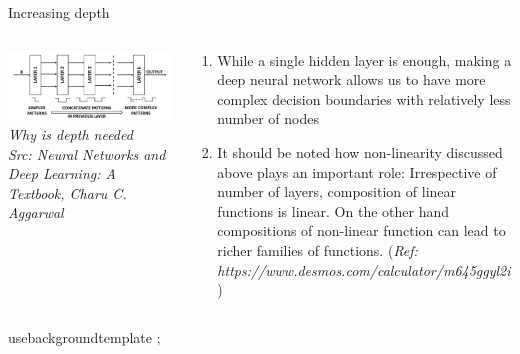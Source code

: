 \begin{frame}{Increasing depth}
  \begin{columns}[T]
  \begin{column}{0.4\textwidth}
	\includegraphics[width=\textwidth]{images/depth.png}
	\tiny{\textit{Why is depth needed\\ Src: Neural Networks and Deep Learning: A Textbook, Charu C. Aggarwal}}
  \end{column}
  \begin{column}{0.6\textwidth}
  \begin{enumerate}[$\bullet$]
  \item While a single hidden layer is enough, making a deep neural network allows us to have more complex decision boundaries with relatively less number of nodes\pause
  \item It should be noted how non-linearity discussed above plays an important role: Irrespective of number of layers, composition of linear functions is linear. On the other hand compositions of non-linear function can lead to richer families of functions. (\textit{Ref: https://www.desmos.com/calculator/m645ggyl2i})
  \end{enumerate}
  \end{column}
\end{columns}
\end{frame}



usebackgroundtemplate{%
 ;
}
\begin{frame}
\end{frame}

